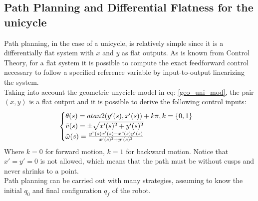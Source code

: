 \subsection{Path Planning and Differential Flatness for the unicycle}
Path planning, in the case of a unicycle, is relatively simple since it is a differentially flat system with $x$ and $y$ as flat outputs. As is known from Control Theory, for a flat system it is possible to compute the exact feedforward control necessary to follow a specified reference variable by input-to-output linearizing the system. \\
Taking into account the geometric unycicle model in eq: \ref{geo_uni_mod}, the pair $(x,y)$ is a flat output and it is possible to derive the following control inputs:
\begin{gather*}
    \begin{cases}
        \theta(s)=atan2(y'(s),x'(s))+k\pi, k=\{0,1\} \\
        \tilde{v}(s)=\pm \sqrt{x'(s)^2+y'(s)^2}\\
        \tilde{\omega}(s)=\frac{y"(s)x'(s)-x"(s)y'(s)}{x'(s)^2+y'(s)^2}
    \end{cases}
\end{gather*}
Where $k=0$ for forward motion, $k=1$ for backward motion. Notice that $x'=y'=0$ is not allowed, which means that the path must be without cusps and never shrinks to a point. \\
Path planning can be carried out with many strategies, assuming to know the initial $q_0$ and final configuration $q_f$ of the robot. 
